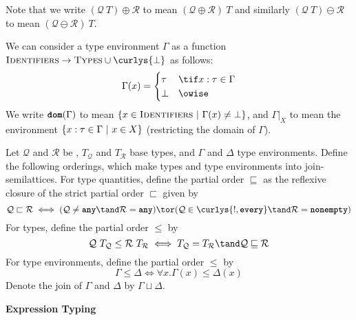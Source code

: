 \documentclass[dvipsnames, usenames, sigconf]{acmart}
\begin{document}
Note that we write $(\mathcal{Q}~T) \oplus \mathcal{R}$ to mean $(\mathcal{Q} \oplus \mathcal{R})~T$ and similarly $(\mathcal{Q}~T) \ominus \mathcal{R}$ to mean $(\mathcal{Q} \ominus \mathcal{R})~T$.

\begin{definition}
    We can consider a type environment $\Gamma$ as a function $\textsc{Identifiers}\xspace \to \textsc{Types}\xspace \cup \curlys{\bot}$ as follows:
    \[
        \Gamma(x) =
        \begin{cases}
            \tau & \tif x : \tau \in \Gamma \\
            \bot & \owise
        \end{cases}
    \]
    We write $\textbf{\texttt{dom}}(\Gamma)$ to mean $\left\{ {x \in \textsc{Identifiers}} ~|~ {\Gamma(x) \neq \bot} \right\}$, and $\Gamma|_X$ to mean the environment $\left\{ {x : \tau \in \Gamma} ~|~ {x \in X} \right\}$ (restricting the domain of $\Gamma$).
\end{definition}

\begin{definition}
    Let $\mathcal{Q}$ and $\mathcal{R}$ be \typeQuantities, $T_\mathcal{Q}$ and $T_\mathcal{R}$ base types, and $\Gamma$ and $\Delta$ type environments.
    Define the following orderings, which make types and type environments into join-semilattices.
    For type quantities, define the partial order $\sqsubseteq$ as the reflexive closure of the strict partial order $\sqsubset$ given by
    \[
        \mathcal{Q} \sqsubset \mathcal{R} \iff (\mathcal{Q} \neq \any \tand \mathcal{R} = \any) \tor (\mathcal{Q} \in \curlys{\exactlyone, \every} \tand \mathcal{R} = \nonempty)
    \]
    For types, define the partial order $\leq$ by
    \[
        \mathcal{Q}~T_\mathcal{Q} \leq \mathcal{R}~T_\mathcal{R} \iff T_\mathcal{Q} = T_\mathcal{R} \tand \mathcal{Q} \sqsubseteq \mathcal{R}
    \]
    For type environments, define the partial order $\leq$ by
    \[
        \Gamma \leq \Delta \iff \forall x. \Gamma(x) \leq \Delta(x)
    \]
    Denote the join of $\Gamma$ and $\Delta$ by $\Gamma \sqcup \Delta$.
\end{definition}

 \textbf{Expression Typing}
\end{document}
